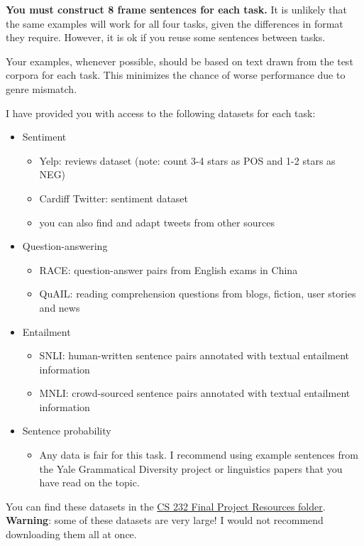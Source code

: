 \documentclass[12pt,table]{article}
\begin{document}
\textbf{You must construct 8 frame sentences for each task.} It is unlikely that the same examples will work for all four tasks, given the differences in format they require. However, it is ok if you reuse some sentences between tasks.

Your examples, whenever possible, should be based on text drawn from the test corpora for each task. This minimizes the chance of worse performance due to genre mismatch.

I have provided you with access to the following datasets for each task:

\begin{itemize}
\item Sentiment
\begin{itemize}
\item Yelp: reviews dataset (note: count 3-4 stars as POS and 1-2 stars as NEG)
\item Cardiff Twitter: sentiment dataset
\item you can also find and adapt tweets from other sources
\end{itemize}
\item Question-answering
\begin{itemize}
\item RACE: question-answer pairs from English exams in China
\item QuAIL: reading comprehension questions from blogs, fiction, user stories and news
\end{itemize}
\item Entailment
\begin{itemize}
\item SNLI: human-written sentence pairs annotated with textual entailment information
\item MNLI: crowd-sourced sentence pairs annotated with textual entailment information
\end{itemize}
\item Sentence probability
\begin{itemize}
\item Any data is fair for this task. I recommend using example sentences from the Yale Grammatical Diversity project or linguistics papers that you have read on the topic.
\end{itemize}
\end{itemize}

You can find these datasets in the \href{https://drive.google.com/drive/folders/1iHJ7GRd5YiAtT4NkOLBJKaMLCzLaElAD}{CS 232 Final Project Resources folder}. \textbf{Warning}: some of these datasets are very large! I would not recommend downloading them all at once.
\end{document}
